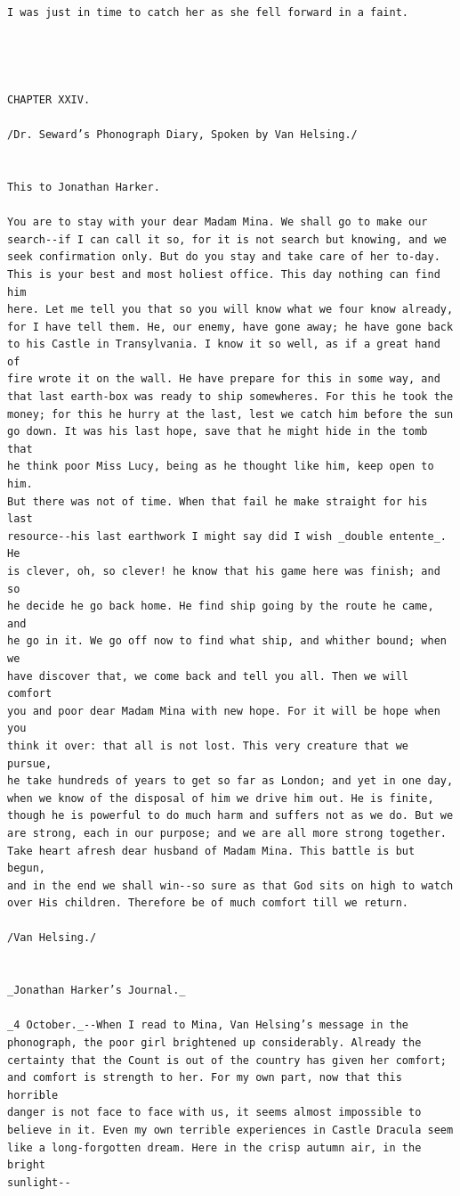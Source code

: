 \documentclass{article}
\begin{document}
\begin{verbatim}
I was just in time to catch her as she fell forward in a faint.




CHAPTER XXIV.

/Dr. Seward’s Phonograph Diary, Spoken by Van Helsing./


This to Jonathan Harker.

You are to stay with your dear Madam Mina. We shall go to make our
search--if I can call it so, for it is not search but knowing, and we
seek confirmation only. But do you stay and take care of her to-day.
This is your best and most holiest office. This day nothing can find him
here. Let me tell you that so you will know what we four know already,
for I have tell them. He, our enemy, have gone away; he have gone back
to his Castle in Transylvania. I know it so well, as if a great hand of
fire wrote it on the wall. He have prepare for this in some way, and
that last earth-box was ready to ship somewheres. For this he took the
money; for this he hurry at the last, lest we catch him before the sun
go down. It was his last hope, save that he might hide in the tomb that
he think poor Miss Lucy, being as he thought like him, keep open to him.
But there was not of time. When that fail he make straight for his last
resource--his last earthwork I might say did I wish _double entente_. He
is clever, oh, so clever! he know that his game here was finish; and so
he decide he go back home. He find ship going by the route he came, and
he go in it. We go off now to find what ship, and whither bound; when we
have discover that, we come back and tell you all. Then we will comfort
you and poor dear Madam Mina with new hope. For it will be hope when you
think it over: that all is not lost. This very creature that we pursue,
he take hundreds of years to get so far as London; and yet in one day,
when we know of the disposal of him we drive him out. He is finite,
though he is powerful to do much harm and suffers not as we do. But we
are strong, each in our purpose; and we are all more strong together.
Take heart afresh dear husband of Madam Mina. This battle is but begun,
and in the end we shall win--so sure as that God sits on high to watch
over His children. Therefore be of much comfort till we return.

/Van Helsing./


_Jonathan Harker’s Journal._

_4 October._--When I read to Mina, Van Helsing’s message in the
phonograph, the poor girl brightened up considerably. Already the
certainty that the Count is out of the country has given her comfort;
and comfort is strength to her. For my own part, now that this horrible
danger is not face to face with us, it seems almost impossible to
believe in it. Even my own terrible experiences in Castle Dracula seem
like a long-forgotten dream. Here in the crisp autumn air, in the bright
sunlight--


\end{verbatim}
\end{document}
